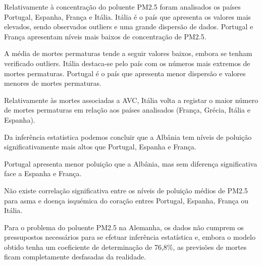 \documentclass[conference]{IEEEtran}
\begin{document}
Relativamente à concentração do poluente PM2.5 foram analisados os países Portugal, Espanha, França e Itália. Itália é o país que apresenta os valores mais elevados, sendo observados outliers e uma grande dispersão de dados. Portugal e França apresentam níveis mais baixos de concentração de PM2.5.

A média de mortes permaturas tende a seguir valores baixos, embora se tenham verificado outliers. Itália destaca-se pelo país com os números mais extremos de mortes permaturas. Portugal é o país que apresenta menor dispersão e valores menores de mortes permaturas.

Relativamente às mortes associadas a AVC, Itália volta a registar o maior número de mortes permaturas em relação aos países analisados (França, Grécia, Itália e Espanha).

Da inferência estatistica podemos concluir que a Albânia tem níveis de poluição significativamente mais altos que Portugal, Espanha e França.

Portugal apresenta menor poluição que a Albânia, mas sem diferença significativa face a Espanha e França.

Não existe correlação significativa entre os níveis de poluição médios de PM2.5 para asma e doença isquémica do coração entres Portugal, Espanha, França ou Itália.

Para o problema do poluente PM2.5 na Alemanha, os dados não cumprem os pressupostos necessários para se efetuar inferência estatística e, embora o modelo obtido tenha um coeficiente de determinação de 76,8\%, as previsões de mortes ficam completamente desfasadas da realidade.
\end{document}
